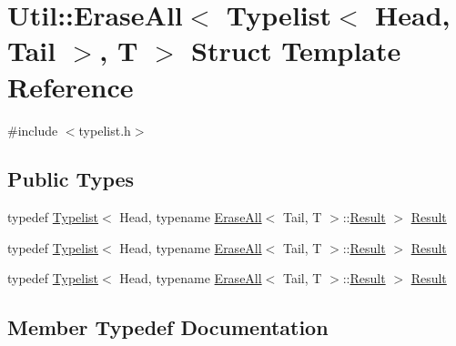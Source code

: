 \hypertarget{structUtil_1_1TL_1_1EraseAll_3_01Typelist_3_01Head_00_01Tail_01_4_00_01T_01_4}{}\section{Util\+:\+:Erase\+All$<$ Typelist$<$ Head, Tail $>$, T $>$ Struct Template Reference}
\label{structUtil_1_1TL_1_1EraseAll_3_01Typelist_3_01Head_00_01Tail_01_4_00_01T_01_4}


{\ttfamily \#include $<$typelist.\+h$>$}

\subsection*{Public Types}
\begin{DoxyCompactItemize}
\item 
typedef \mbox{\hyperlink{structUtil_1_1Typelist}{Typelist}}$<$ Head, typename \mbox{\hyperlink{structUtil_1_1TL_1_1EraseAll}{Erase\+All}}$<$ Tail, T $>$\+::\mbox{\hyperlink{structUtil_1_1TL_1_1EraseAll_3_01Typelist_3_01Head_00_01Tail_01_4_00_01T_01_4_aa724903cc91ed9eea3da277857c8f5aa}{Result}} $>$ \mbox{\hyperlink{structUtil_1_1TL_1_1EraseAll_3_01Typelist_3_01Head_00_01Tail_01_4_00_01T_01_4_aa724903cc91ed9eea3da277857c8f5aa}{Result}}
\item 
typedef \mbox{\hyperlink{structUtil_1_1Typelist}{Typelist}}$<$ Head, typename \mbox{\hyperlink{structUtil_1_1TL_1_1EraseAll}{Erase\+All}}$<$ Tail, T $>$\+::\mbox{\hyperlink{structUtil_1_1TL_1_1EraseAll_3_01Typelist_3_01Head_00_01Tail_01_4_00_01T_01_4_aa724903cc91ed9eea3da277857c8f5aa}{Result}} $>$ \mbox{\hyperlink{structUtil_1_1TL_1_1EraseAll_3_01Typelist_3_01Head_00_01Tail_01_4_00_01T_01_4_aa724903cc91ed9eea3da277857c8f5aa}{Result}}
\item 
typedef \mbox{\hyperlink{structUtil_1_1Typelist}{Typelist}}$<$ Head, typename \mbox{\hyperlink{structUtil_1_1TL_1_1EraseAll}{Erase\+All}}$<$ Tail, T $>$\+::\mbox{\hyperlink{structUtil_1_1TL_1_1EraseAll_3_01Typelist_3_01Head_00_01Tail_01_4_00_01T_01_4_aa724903cc91ed9eea3da277857c8f5aa}{Result}} $>$ \mbox{\hyperlink{structUtil_1_1TL_1_1EraseAll_3_01Typelist_3_01Head_00_01Tail_01_4_00_01T_01_4_aa724903cc91ed9eea3da277857c8f5aa}{Result}}
\end{DoxyCompactItemize}


\subsection{Member Typedef Documentation}
\mbox{\label{structUtil_1_1TL_1_1EraseAll_3_01Typelist_3_01Head_00_01Tail_01_4_00_01T_01_4_aa724903cc91ed9eea3da277857c8f5aa}} 

